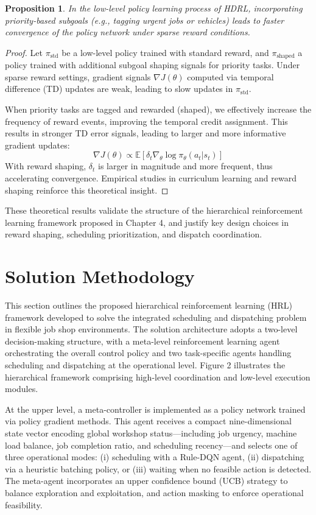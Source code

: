 \documentclass{article}
\newtheorem{proposition}{Proposition}
\begin{document}
\begin{proposition}
In the low-level policy learning process of HDRL, incorporating priority-based subgoals (e.g., tagging urgent jobs or vehicles) leads to faster convergence of the policy network under sparse reward conditions.
\end{proposition}

\begin{proof}
Let $\pi_\text{std}$ be a low-level policy trained with standard reward, and $\pi_\text{shaped}$ a policy trained with additional subgoal shaping signals for priority tasks. Under sparse reward settings, gradient signals $\nabla J(\theta)$ computed via temporal difference (TD) updates are weak, leading to slow updates in $\pi_\text{std}$.

When priority tasks are tagged and rewarded (shaped), we effectively increase the frequency of reward events, improving the temporal credit assignment. This results in stronger TD error signals, leading to larger and more informative gradient updates:
\[
\nabla J(\theta) \propto \mathbb{E}[\delta_t \nabla_\theta \log \pi_\theta(a_t|s_t)]
\]
With reward shaping, $\delta_t$ is larger in magnitude and more frequent, thus accelerating convergence. Empirical studies in curriculum learning and reward shaping reinforce this theoretical insight.
\end{proof}

These theoretical results validate the structure of the hierarchical reinforcement learning framework proposed in Chapter 4, and justify key design choices in reward shaping, scheduling prioritization, and dispatch coordination.


\section{Solution Methodology}
This section outlines the proposed hierarchical reinforcement learning (HRL) framework developed to solve the integrated scheduling and dispatching problem in flexible job shop environments. The solution architecture adopts a two-level decision-making structure, with a meta-level reinforcement learning agent orchestrating the overall control policy and two task-specific agents handling scheduling and dispatching at the operational level. Figure 2 illustrates the hierarchical framework comprising high-level coordination and low-level execution modules.

At the upper level, a meta-controller is implemented as a policy network trained via policy gradient methods. This agent receives a compact nine-dimensional state vector encoding global workshop status—including job urgency, machine load balance, job completion ratio, and scheduling recency—and selects one of three operational modes: (i) scheduling with a Rule-DQN agent, (ii) dispatching via a heuristic batching policy, or (iii) waiting when no feasible action is detected. The meta-agent incorporates an upper confidence bound (UCB) strategy to balance exploration and exploitation, and action masking to enforce operational feasibility.
\end{document}
